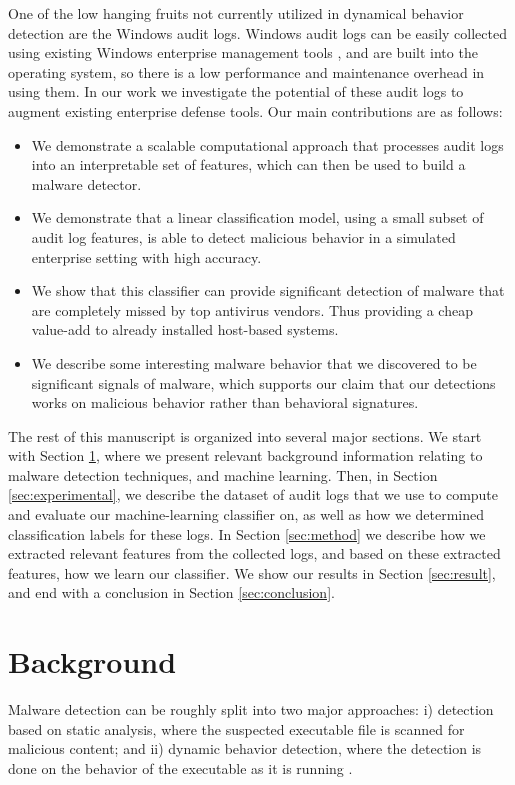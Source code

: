 \documentclass{sig-alternate-2013}
\begin{document}
One of the low hanging fruits not currently utilized in dynamical behavior detection are the Windows audit logs. Windows audit logs can be easily collected using existing Windows enterprise management tools \cite{audit2015}, and are built into the operating system, so there is a low performance and maintenance overhead in using them. In our work we investigate the potential of these audit logs to augment existing enterprise defense tools. Our main contributions are as follows:
\begin{itemize}
\item We demonstrate a scalable computational approach that processes audit logs into an interpretable set of features, which can then be used to build a malware detector.
\item We demonstrate that a linear classification model, using a small subset of audit log features, is able to detect malicious behavior in a simulated enterprise setting with high accuracy.
\item We show that this classifier can provide significant detection of malware that are completely missed by top antivirus vendors. Thus providing a cheap value-add to already installed host-based systems.
\item We describe some interesting malware behavior that we discovered to be significant signals of malware, which supports our claim that our detections works on malicious behavior rather than behavioral signatures.
\end{itemize}

The rest of this manuscript is organized into several major sections. We start with Section \ref{sec:background}, where we present relevant background information relating to malware detection techniques, and machine learning. Then, in Section \ref{sec:experimental}, we describe the dataset of audit logs that we use to compute and evaluate our machine-learning classifier on, as well as how we determined classification labels for these logs. In Section \ref{sec:method} we describe how we extracted relevant features from the collected logs, and based on these extracted features, how we learn our classifier. We show our results in Section \ref{sec:result}, and end with a conclusion in Section \ref{sec:conclusion}. 

\section{Background}
\label{sec:background}

Malware detection can be roughly split into two major approaches: i) detection based on static analysis, where the suspected executable file is scanned for malicious content; and ii) dynamic behavior detection, where the detection is done on the behavior of the executable as it is running \cite{egele2012survey}.
\end{document}
